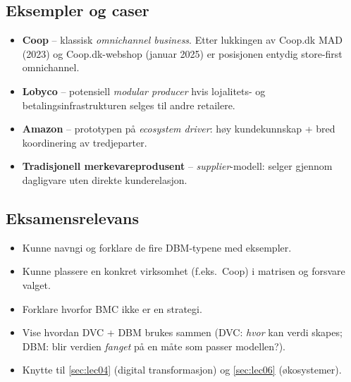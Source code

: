\subsection{Eksempler og caser}
\begin{itemize}
  \item \textbf{Coop} -- klassisk \emph{omnichannel business}. Etter
    lukkingen av Coop.dk MAD (2023) og Coop.dk-webshop (januar 2025) er
    posisjonen entydig store-first omnichannel.
  \item \textbf{Lobyco} -- potensiell \emph{modular producer} hvis lojalitets-
    og betalingsinfrastrukturen selges til andre retailere.
  \item \textbf{Amazon} -- prototypen på \emph{ecosystem driver}: høy
    kundekunnskap + bred koordinering av tredjeparter.
  \item \textbf{Tradisjonell merkevareprodusent} -- \emph{supplier}-modell:
    selger gjennom dagligvare uten direkte kunderelasjon.
\end{itemize}

\subsection{Eksamensrelevans}
\begin{itemize}
  \item Kunne navngi og forklare de fire DBM-typene med eksempler.
  \item Kunne plassere en konkret virksomhet (f.eks.\ Coop) i matrisen og
    forsvare valget.
  \item Forklare hvorfor BMC ikke er en strategi.
  \item Vise hvordan DVC + DBM brukes sammen (DVC: \emph{hvor} kan verdi
    skapes; DBM: blir verdien \emph{fanget} på en måte som passer modellen?).
  \item Knytte til \autoref{sec:lec04} (digital transformasjon) og
    \autoref{sec:lec06} (økosystemer).
\end{itemize}
